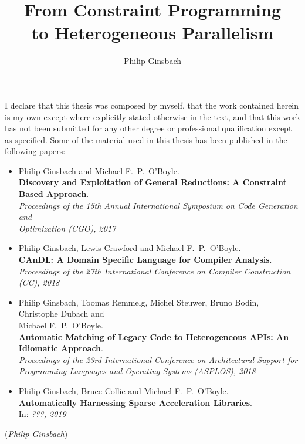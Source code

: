 \documentclass[phd,icsa,twoside,logo,11pt]{infthesis}
\title{From Constraint Programming\\to Heterogeneous Parallelism}
\author{Philip Ginsbach}
\begin{document}
\begin{preliminary}
\maketitle
\begin{acknowledgements}

\end{acknowledgements}
\begin{declaration}
    I declare that this thesis was composed by myself, that the work contained
    herein is my own except where explicitly stated otherwise in the text, and
    that this work has not been submitted for any other degree or professional
    qualification except as specified.
    Some of the material used in this thesis has been published in the following
    papers:

    \begin{itemize}
    \small
        \item Philip Ginsbach and Michael F.\ P.\ O'Boyle.\\
              {\bf Discovery and Exploitation of General Reductions: A
              Constraint Based Approach}.\\
              {\em Proceedings of the 15th Annual International
               Symposium on Code Generation and\\Optimization (CGO), 2017}
        \item Philip Ginsbach, Lewis Crawford and Michael F.\ P.\ O'Boyle.\\
              {\bf CAnDL: A Domain Specific Language for Compiler Analysis}.\\
              {\em Proceedings of the 27th International Conference on
               Compiler Construction (CC), 2018}
        \item Philip Ginsbach, Toomas Remmelg, Michel Steuwer, Bruno Bodin,
              Christophe Dubach and\\Michael F.\ P.\ O'Boyle.\\
              {\bf Automatic Matching of Legacy Code to Heterogeneous APIs: An
              Idiomatic Approach}.\\
              {\em Proceedings of the 23rd International Conference on
               Architectural Support for\\Programming Languages and Operating
               Systems (ASPLOS), 2018}
        \item Philip Ginsbach, Bruce Collie and Michael F.\ P.\ O'Boyle.\\
              {\bf Automatically Harnessing Sparse Acceleration Libraries}.\\
              In: {\em ???, 2019}
    \end{itemize}

    \par
\vspace{1in}\raggedleft({\em Philip Ginsbach})
\end{declaration}
\tableofcontents
\end{preliminary}
\end{document}
